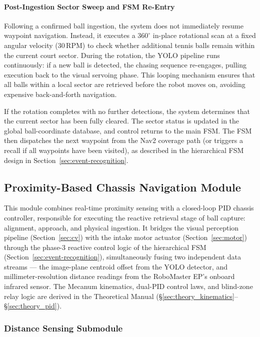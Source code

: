\paragraph{Post-Ingestion Sector Sweep and FSM Re-Entry}

Following a confirmed ball ingestion, the system does not immediately resume waypoint navigation. Instead, it executes a $360^\circ$ in-place rotational scan at a fixed angular velocity (30\,RPM) to check whether additional tennis balls remain within the current court sector. During the rotation, the YOLO pipeline runs continuously: if a new ball is detected, the chasing sequence re-engages, pulling execution back to the visual servoing phase. This looping mechanism ensures that all balls within a local sector are retrieved before the robot moves on, avoiding expensive back-and-forth navigation.

If the rotation completes with no further detections, the system determines that the current sector has been fully cleared. The sector status is updated in the global ball-coordinate database, and control returns to the main FSM. The FSM then dispatches the next waypoint from the Nav2 coverage path (or triggers a recall if all waypoints have been visited), as described in the hierarchical FSM design in Section~\ref{sec:event-recognition}.

\subsection{Proximity-Based Chassis Navigation Module}
\label{sec:chassis}
This module combines real-time proximity sensing with a closed-loop PID chassis controller, responsible for executing the reactive retrieval stage of ball capture: alignment, approach, and physical ingestion. It bridges the visual perception pipeline (Section~\ref{sec:cv}) with the intake motor actuator (Section~\ref{sec:motor}) through the phase-3 reactive control logic of the hierarchical FSM (Section~\ref{sec:event-recognition}), simultaneously fusing two independent data streams — the image-plane centroid offset from the YOLO detector, and millimeter-resolution distance readings from the RoboMaster EP's onboard infrared sensor. The Mecanum kinematics, dual-PID control laws, and blind-zone relay logic are derived in the Theoretical Manual (\S\ref{sec:theory_kinematics}--\S\ref{sec:theory_pid}).

\subsubsection{Distance Sensing Submodule}
\label{sec:distance_sub}

